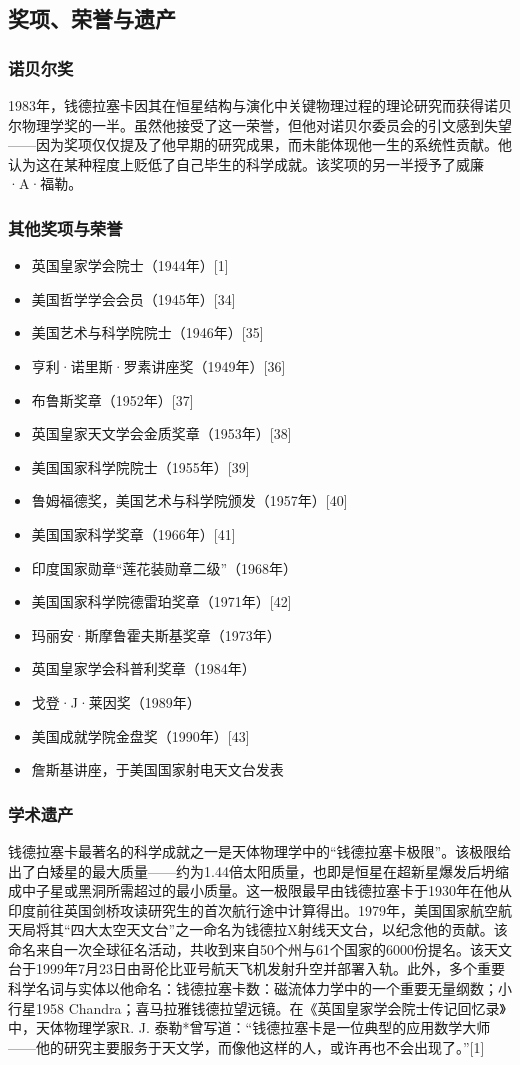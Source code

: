 \subsection{奖项、荣誉与遗产}
\subsubsection{诺贝尔奖}
1983年，钱德拉塞卡因其在恒星结构与演化中关键物理过程的理论研究而获得诺贝尔物理学奖的一半。虽然他接受了这一荣誉，但他对诺贝尔委员会的引文感到失望——因为奖项仅仅提及了他早期的研究成果，而未能体现他一生的系统性贡献。他认为这在某种程度上贬低了自己毕生的科学成就。该奖项的另一半授予了威廉·A·福勒。
\subsubsection{其他奖项与荣誉}
\begin{itemize}
\item 英国皇家学会院士（1944年）[1]
\item 美国哲学学会会员（1945年）[34]
\item 美国艺术与科学院院士（1946年）[35]
\item 亨利·诺里斯·罗素讲座奖（1949年）[36]
\item 布鲁斯奖章（1952年）[37]
\item 英国皇家天文学会金质奖章（1953年）[38]
\item 美国国家科学院院士（1955年）[39]
\item 鲁姆福德奖，美国艺术与科学院颁发（1957年）[40]
\item 美国国家科学奖章（1966年）[41]
\item 印度国家勋章“莲花装勋章二级”（1968年）
\item 美国国家科学院德雷珀奖章（1971年）[42]
\item 玛丽安·斯摩鲁霍夫斯基奖章（1973年）
\item 英国皇家学会科普利奖章（1984年）
\item 戈登·J·莱因奖（1989年）
\item 美国成就学院金盘奖（1990年）[43]
\item 詹斯基讲座，于美国国家射电天文台发表
\end{itemize}
\subsubsection{学术遗产}
钱德拉塞卡最著名的科学成就之一是天体物理学中的“钱德拉塞卡极限”。该极限给出了白矮星的最大质量——约为1.44倍太阳质量，也即是恒星在超新星爆发后坍缩成中子星或黑洞所需超过的最小质量。这一极限最早由钱德拉塞卡于1930年在他从印度前往英国剑桥攻读研究生的首次航行途中计算得出。1979年，美国国家航空航天局将其“四大太空天文台”之一命名为钱德拉X射线天文台，以纪念他的贡献。该命名来自一次全球征名活动，共收到来自50个州与61个国家的6000份提名。该天文台于1999年7月23日由哥伦比亚号航天飞机发射升空并部署入轨。此外，多个重要科学名词与实体以他命名：钱德拉塞卡数：磁流体力学中的一个重要无量纲数；小行星1958 Chandra；喜马拉雅钱德拉望远镜。在《英国皇家学会院士传记回忆录》中，天体物理学家R. J. 泰勒*曾写道：“钱德拉塞卡是一位典型的应用数学大师——他的研究主要服务于天文学，而像他这样的人，或许再也不会出现了。”[1]

